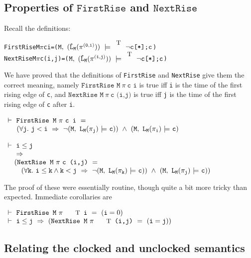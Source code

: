 \documentclass{llncs}
\newcommand{\T}{\texttt{\small\rm{T}}}
\newcommand{\bTrue}{\T}
\renewcommand{\Pi}{\(\pi\)}
\newcommand{\bSem}[3]{(\tt#1,~#2~{\models}~#3)}
\newcommand{\SSem}[4]{(\(\tt{#1,~#2~\models^{\hspace*{-2.3mm}\raisebox{1mm}{\tt#3}}~#4}\))}
\newcommand{\bNot}[1]{\neg#1}
\newcommand{\pathSeg}[2]{#1^{#2}}
\newcommand{\lHat}[1]{\hat{\texttt{L}}_{#1}}
\newcommand{\sBool}[1]{#1}
\newcommand{\sRepeat}[1]{#1\texttt{[*]}}
\newcommand{\sCat}[2]{#1\texttt{;}#2}
\renewcommand{\t}[1]{\texttt{#1}}
\begin{document}
\subsection{Properties of $\t{FirstRise}$ and $\t{NextRise}$}

Recall the definitions:


{\begin{alltt}
   FirstRise M {\Pi} c i    = \SSem{M}{(\lHat{M} (\pathSeg{\pi}{(0,i)}))}{\bTrue}{\sCat{\sRepeat{\sBool{\bNot{c}}}}{\sBool{c}}}
   NextRise M {\Pi} c (i,j) = \SSem{M}{(\lHat{M} (\pathSeg{\pi}{(i,j)}))}{\bTrue}{\sCat{\sRepeat{\sBool{\bNot{c}}}}{\sBool{c}}}
\end{alltt}}

We have proved that the definitions of \t{FirstRise} and \t{NextRise} give them the correct meaning,
namely $\t{FirstRise~M}~{\pi}~\t{c~i}$ is true iff \t{i} is the time of the first
rising edge of \t{c},
and $\t{NextRise~M}~{\pi}~\t{c~(i,j)}$ is true iff \t{j} is the time of the first
rising edge of \t{c} after \t{i}.

\medskip

$\begin{array}{l}
\vdash~ \t{FirstRise~M}~{\pi}~\t{c~i}~=\\
\phantom{\vdash~}
~(\forall \t{j}.~\t{j} < \t{i} ~\Rightarrow~\neg\bSem{M}{L_{M}(\pi_j)}{\t{c}})~\wedge~\bSem{M}{L_{M}(\pi_i)}{\t{c}}\\
 \\
\vdash~ \t{i}\leq \t{j}\\
\phantom{\vdash~}
\Rightarrow\\
\phantom{\vdash~}
(\t{NextRise~M}~{\pi}~\t{c~(i,j)}~=\\
\phantom{\vdash~(}
~(\forall \t{k}.~\t{i} \leq \t{k} \wedge \t{k} < \t{j} ~\Rightarrow~\neg\bSem{M}{L_{M}(\pi_k)}{\t{c}})~\wedge~\bSem{M}{L_{M}(\pi_j)}{\t{c}})
\end{array}$

\medskip

The proof of these were essentially routine, though quite a bit more tricky than expected. Immediate corollaries are


\medskip

$\begin{array}{l}
\vdash~ \t{FirstRise~M}~{\pi}~\t{\T~i}~=~(\t{i}=0)
 \\
\vdash~ \t{i}\leq \t{j}~\Rightarrow~(\t{NextRise~M}~{\pi}~\t{\T~(i,j)}~=~(\t{i} = \t{j}))
\end{array}$

\subsection{Relating the clocked and unclocked semantics}\label{relatingclocks}
\end{document}
